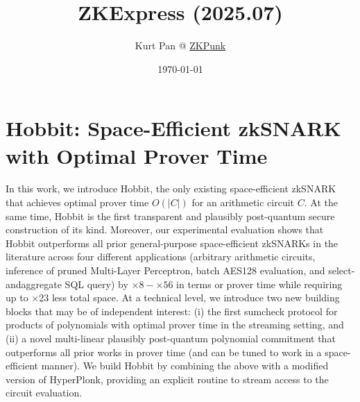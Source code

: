 \documentclass[11pt]{article}
\theoremstyle{definition}
\theoremstyle{remark}
\theoremstyle{plain}
\begin{document}
\title{ZKExpress (2025.07)}
\author{Kurt Pan @ \href{https://zkpunk.pro}{ZKPunk}}
\date{\today}
\maketitle
\tableofcontents

\section{\cite{cryptoeprint:2025/1214} Hobbit: Space-Efficient {zkSNARK} with Optimal Prover Time}
In this work, we introduce Hobbit, the only existing space-efficient zkSNARK that achieves optimal prover time $O(|C|)$ for an arithmetic circuit $C$. At the same time, Hobbit is the first transparent and plausibly post-quantum secure construction of its kind. Moreover, our experimental evaluation shows that Hobbit outperforms all prior general-purpose space-efficient zkSNARKs in the literature across four different applications (arbitrary arithmetic circuits, inference of pruned Multi-Layer Perceptron, batch AES128 evaluation, and select-andaggregate SQL query) by $\times 8-\times 56$ in terms or prover time while requiring up to $\times 23$ less total space.
At a technical level, we introduce two new building blocks that may be of independent interest: (i) the first sumcheck protocol for products of polynomials with optimal prover time in the streaming setting, and (ii) a novel multi-linear plausibly post-quantum polynomial commitment that outperforms all prior works in prover time (and can be tuned to work in a space-efficient manner). We build Hobbit by combining the above with a modified version of HyperPlonk, providing an explicit routine to stream access to the circuit evaluation.
\end{document}
